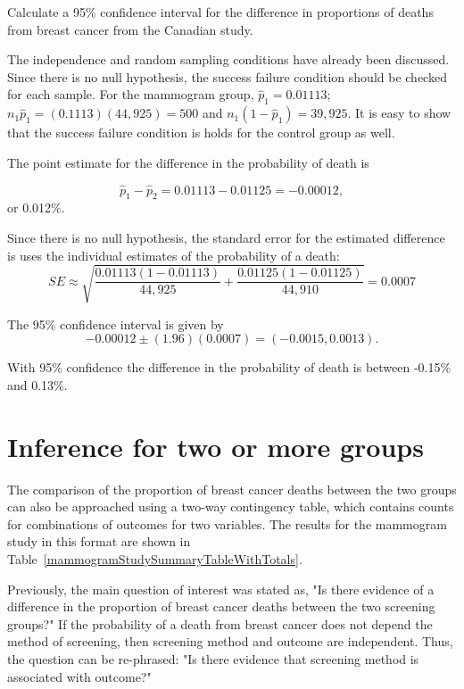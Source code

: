 \begin{example}{Calculate a 95\% confidence interval for the difference in proportions of deaths from breast cancer from the Canadian study.}

\label{mammogramExConfInt}

The independence and random sampling conditions have already been discussed.  Since there is no null hypothesis, the success failure condition should be checked for each sample.  For the mammogram group, $\hat{p}_1 = 0.01113$; $n_1 \hat{p}_1 = (0.1113)(44,925) = 500$ and $n_1 (1 - \hat{p}_1) = 39,925.$ It is easy to show that the success failure condition is holds for the control group as well.

The point estimate for the difference in the probability of death is

$$\hat{p}_{1} - \hat{p}_{2} = 0.01113 - 0.01125 = -0.00012,$$ or 0.012\%.

Since there is no null hypothesis, the standard error for the estimated difference is uses the individual estimates of the probability of a death:
$$SE \approx \sqrt{\frac{0.01113(1-0.01113)}{44,925} + \frac{0.01125(1-0.01125)}{44,910}} = 0.0007 $$

The 95\% confidence interval is given by 
$$ -0.00012 \pm (1.96) (0.0007) = (-0.0015, 0.0013).$$

With 95\% confidence the difference in the probability of death is between -0.15\% and 0.13\%. 

\end{example}





\section{Inference for two or more groups}
\label{twoWayTablesAndChiSquare}

The comparison of the proportion of breast cancer deaths between the two groups can also be approached using a two-way contingency table, which contains counts for combinations of outcomes for two variables. The results for the mammogram study in this format are shown in Table~\ref{mammogramStudySummaryTableWithTotals}.

Previously, the main question of interest was stated as, "Is there evidence of a difference in the proportion of breast cancer deaths between the two screening groups?" If the probability of a death from breast cancer does not depend the method of screening, then screening method and outcome are independent. Thus, the question can be re-phrased: "Is there evidence that screening method is associated with outcome?"

